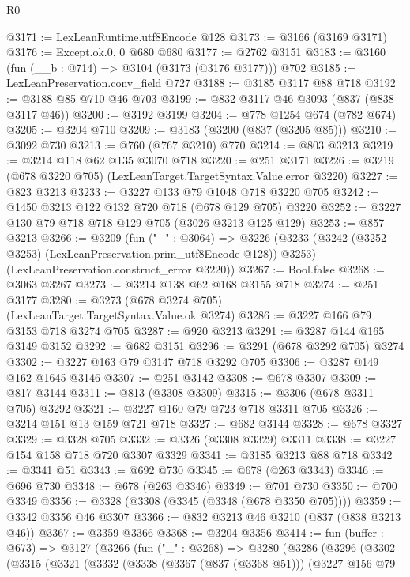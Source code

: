 \begin{lexlean}{R0}
\begin{coremodule}
@3171 := LexLeanRuntime.utf8Encode @128
@3173 := @3166 (@3169 @3171)
@3176 := Except.ok.{0, 0} @680 @680
@3177 := @2762 @3151
@3183 := @3160 (fun (__b : @714) => @3104 (@3173 (@3176 @3177))) @702
@3185 := LexLeanPreservation.conv_field @727
@3188 := @3185 @3117 @88 @718
@3192 := @3188 @85 @710 @46 @703
@3199 := @832 @3117 @46 @3093 (@837 (@838 @3117 @46))
@3200 := @3192 @3199
@3204 := @778 @1254 @674 (@782 @674)
@3205 := @3204 @710
@3209 := @3183 (@3200 (@837 (@3205 @85)))
@3210 := @3092 @730
@3213 := @760 (@767 @3210) @770
@3214 := @803 @3213
@3219 := @3214 @118 @62 @135 @3070 @718
@3220 := @251 @3171
@3226 := @3219 (@678 @3220 @705) (LexLeanTarget.TargetSyntax.Value.error @3220)
@3227 := @823 @3213
@3233 := @3227 @133 @79 @1048 @718 @3220 @705
@3242 := @1450 @3213 @122 @132 @720 @718 (@678 @129 @705) @3220
@3252 := @3227 @130 @79 @718 @718 @129 @705 (@3026 @3213 @125 @129)
@3253 := @857 @3213
@3266 := @3209
    (fun ("_" : @3064) =>
    @3226
      (@3233 (@3242 (@3252 @3253) (LexLeanPreservation.prim_utf8Encode @128)) @3253)
      (LexLeanPreservation.construct_error @3220))
@3267 := Bool.false
@3268 := @3063 @3267
@3273 := @3214 @138 @62 @168 @3155 @718
@3274 := @251 @3177
@3280 := @3273 (@678 @3274 @705) (LexLeanTarget.TargetSyntax.Value.ok @3274)
@3286 := @3227 @166 @79 @3153 @718 @3274 @705
@3287 := @920 @3213
@3291 := @3287 @144 @165 @3149 @3152
@3292 := @682 @3151
@3296 := @3291 (@678 @3292 @705) @3274
@3302 := @3227 @163 @79 @3147 @718 @3292 @705
@3306 := @3287 @149 @162 @1645 @3146
@3307 := @251 @3142
@3308 := @678 @3307
@3309 := @817 @3144
@3311 := @813 (@3308 @3309)
@3315 := @3306 (@678 @3311 @705) @3292
@3321 := @3227 @160 @79 @723 @718 @3311 @705
@3326 := @3214 @151 @13 @159 @721 @718
@3327 := @682 @3144
@3328 := @678 @3327
@3329 := @3328 @705
@3332 := @3326 (@3308 @3329) @3311
@3338 := @3227 @154 @158 @718 @720 @3307 @3329
@3341 := @3185 @3213 @88 @718
@3342 := @3341 @51
@3343 := @692 @730
@3345 := @678 (@263 @3343)
@3346 := @696 @730
@3348 := @678 (@263 @3346)
@3349 := @701 @730
@3350 := @700 @3349
@3356 := @3328 (@3308 (@3345 (@3348 (@678 @3350 @705))))
@3359 := @3342 @3356 @46 @3307
@3366 := @832 @3213 @46 @3210 (@837 (@838 @3213 @46))
@3367 := @3359 @3366
@3368 := @3204 @3356
@3414 := fun (buffer : @673) =>
  @3127
    (@3266
      (fun ("_" : @3268) =>
      @3280
        (@3286
          (@3296
            (@3302
              (@3315
                (@3321
                  (@3332
                    (@3338
                      (@3367 (@837 (@3368 @51)))
                      (@3227
                        @156
                        @79

\end{coremodule}
\end{lexlean}
